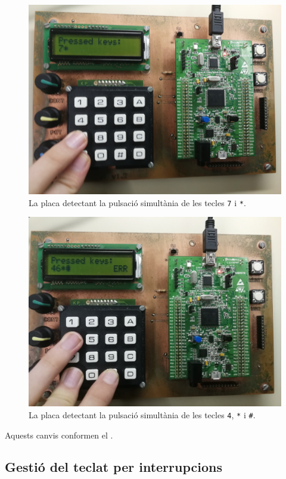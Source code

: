 \begin{figure}[p] %
  \includegraphics[width=.82\columnwidth]{../photos/board/c1-keys-two}
  \caption{ \label{fig:c1-board-keys-two} La placa detectant la pulsació simultània de les tecles \texttt{7} i \texttt{*}. }
\end{figure}
\begin{figure}[p]
  \includegraphics[width=.82\columnwidth]{../photos/board/c1-keys-error_2}
  \caption{ \label{fig:c1-board-keys-error} La placa detectant la pulsació simultània de les tecles \texttt{4}, \texttt{*} i \texttt{\#}. }
\end{figure}

Aquests canvis conformen el .

\subsection{Gestió del teclat per interrupcions}


